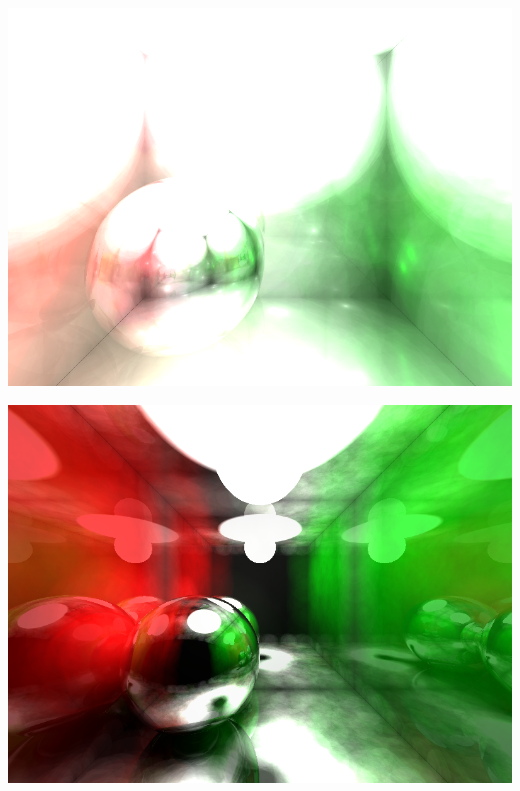 \documentclass[a4paper]{article}
\begin{document}
\begin{center}
	\includegraphics[scale=0.45]{images/gallery/reflection.png}
	\label{fig:reflections}
\end{center}

\begin{center}
	\includegraphics[scale=0.45]{images/gallery/color_bleed.png}
	\label{fig:caustics}
\end{center}
\end{document}
